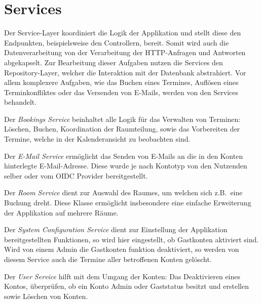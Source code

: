 
\chapter{Services}
\label{ch:services}

Der Service-Layer koordiniert die Logik der Applikation und stellt diese den Endpunkten, beispielsweise den Controllern, bereit.
Somit wird auch die Datenverarbeitung von der Verarbeitung der HTTP-Anfragen und Antworten abgekapselt.
Zur Bearbeitung dieser Aufgaben nutzen die Services den Repository-Layer, welcher die Interaktion mit der Datenbank abstrahiert.
Vor allem komplexere Aufgaben, wie das Buchen eines Termines, Auflösen eines Terminkonfliktes oder das
Versenden von E-Mails, werden von den Services behandelt.

Der \textit{Bookings Service} beinhaltet alle Logik für das Verwalten von Terminen: Löschen, Buchen, Koordination der Raumteilung, sowie das Vorbereiten der Termine, welche in der Kalenderansicht zu beobachten sind.

Der \textit{E-Mail Service} ermöglicht das Senden von E-Mails an die in den Konten hinterlegte E-Mail-Adresse.
Diese wurde je nach Kontotyp von den Nutzenden selber oder vom \gls{OIDC} Provider bereitgestellt.

Der \textit{Room Service} dient zur Auswahl des Raumes, um welchen sich z.B.\ eine Buchung dreht.
Diese Klasse ermöglicht insbesondere eine einfache Erweiterung der Applikation auf mehrere Räume.

Der \textit{System Configuration Service} dient zur Einstellung der Applikation bereitgestellten Funktionen, so wird hier eingestellt, ob Gastkonten aktiviert sind.
Wird von einem Admin die Gastkonten funktion deaktiviert, so werden von diesem Service auch die Termine aller betroffenen Konten gelöscht.

Der \textit{User Service} hilft mit dem Umgang der Konten: Das Deaktivieren eines Kontos, überprüfen, ob ein Konto Admin oder Gaststatus besitzt und erstellen sowie Löschen von Konten.


